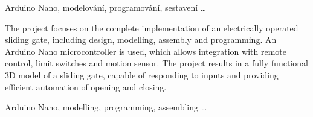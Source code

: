 \documentclass[12pt, a4paper, twoside]{report}
\begin{document}
	\noindent Arduino Nano, modelování, programování, sestavení \dots 
	
	\vspace{0.04 \textheight}
	\noindent The project focuses on the complete implementation of an electrically operated sliding gate, including design, modelling, assembly and programming. An Arduino Nano microcontroller is used, which allows integration with remote control, limit switches and motion sensor. The project results in a fully functional 3D model of a sliding gate, capable of responding to inputs and providing efficient automation of opening and closing. \\
	
	\vspace{18pt}
	
	
	\noindent Arduino Nano, modelling, programming, assembling \dots 
	
	
	
	
\end{document}
